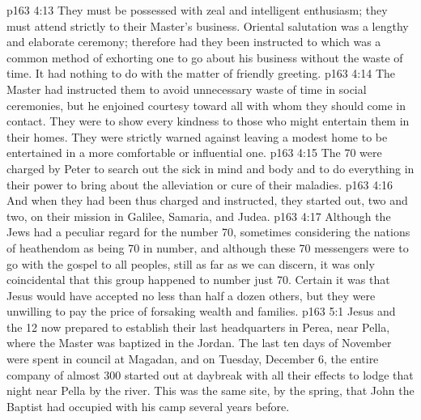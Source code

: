 \vs p163 4:13 \bibnobreakspace {} They must be possessed with zeal and intelligent enthusiasm; they must attend strictly to their Master’s business. Oriental salutation was a lengthy and elaborate ceremony; therefore had they been instructed to  which was a common method of exhorting one to go about his business without the waste of time. It had nothing to do with the matter of friendly greeting.
\vs p163 4:14 \bibnobreakspace {} The Master had instructed them to avoid unnecessary waste of time in social ceremonies, but he enjoined courtesy toward all with whom they should come in contact. They were to show every kindness to those who might entertain them in their homes. They were strictly warned against leaving a modest home to be entertained in a more comfortable or influential one.
\vs p163 4:15 \bibnobreakspace {} The 70 were charged by Peter to search out the sick in mind and body and to do everything in their power to bring about the alleviation or cure of their maladies.
\vs p163 4:16 \pc And when they had been thus charged and instructed, they started out, two and two, on their mission in Galilee, Samaria, and Judea.
\vs p163 4:17 Although the Jews had a peculiar regard for the number 70, sometimes considering the nations of heathendom as being 70 in number, and although these 70 messengers were to go with the gospel to all peoples, still as far as we can discern, it was only coincidental that this group happened to number just 70. Certain it was that Jesus would have accepted no less than half a dozen others, but they were unwilling to pay the price of forsaking wealth and families.
\vs p163 5:1 Jesus and the 12 now prepared to establish their last headquarters in Perea, near Pella, where the Master was baptized in the Jordan. The last ten days of November were spent in council at Magadan, and on Tuesday, December 6, the entire company of almost 300 started out at daybreak with all their effects to lodge that night near Pella by the river. This was the same site, by the spring, that John the Baptist had occupied with his camp several years before.
